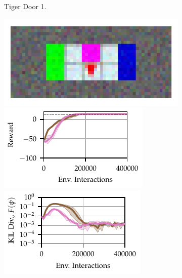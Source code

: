 \begin{figure}[t]
\begin{subfigure}[t]{0.3\textwidth}
        \caption{Tiger Door 1.}
        \label{supp:fig:grid:OSC:td1}
    \end{subfigure}%
    \hfill%
    \begin{subfigure}[t]{0.3\textwidth}
        \includegraphics[width=\textwidth]{figures/OSC/TD2.pdf}
        \includegraphics[width=\textwidth]{figures/OSC/cr_osc_6/OSC_TD2_lam05_reward_TigerDoor_True_v2_cr_osc_6_q0_2021_06_07__18_05_38_.pdf}
        \includegraphics[width=\textwidth]{figures/OSC/cr_osc_6/OSC_TD2_lam05_divergence_TigerDoor_True_v2_cr_osc_6_q0_2021_06_07__18_05_38_.pdf}

\end{subfigure}
\end{figure}
